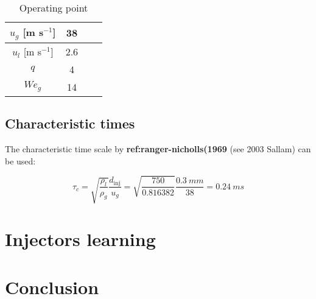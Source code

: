 \begin{table}[!h]
\centering
\caption{Operating point}
\begin{tabular}{cccc}
\thickhline
$u_g$ [m s$^{-1}$] &  38 \\
\hline
$u_l$ [m s$^{-1}$] &  2.6 \\
\hline
\hline
$q$ & 4 \\ %
\hline
$We_g$ & 14 \\
\hline
\end{tabular}
\label{tab:bimer_sps_operating_point}
\end{table}



\subsection{Characteristic times}

The characteristic time scale by \textbf{ref:ranger-nicholls(1969} (see 2003 Sallam) can be used:

\begin{equation}
\tau_c = \sqrt{\frac{\rho_l}{\rho_g}} \frac{d_\mathrm{inj}}{u_g} = \sqrt{\frac{750}{0.816382 }} \frac{0.3 ~mm}{38} = 0.24 ~ms
\end{equation}

%
%

\section{Injectors learning}

\section{Conclusion}
